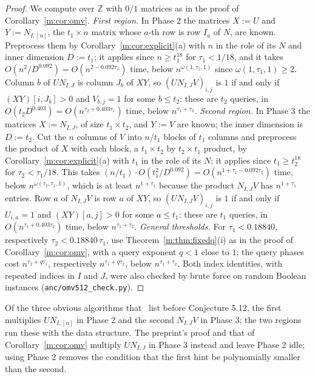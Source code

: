 \documentclass[11pt]{article}
\theoremstyle{definition}
\theoremstyle{remark}
\newcommand{\Z}{\mathbb{Z}}
\newcommand{\HintedOMvRfourteen}{0.18840}%
\begin{document}
\begin{proof}
We compute over $\Z$ with $0/1$ matrices as in the proof of Corollary~\ref{m:cor:omv}. \emph{First region.} In Phase 2 the matrices $X:=U$ and $Y:=N_{I,[n]}$, the $t_1\times n$ matrix whose $a$-th row is row $I_a$ of $N$, are known. Preprocess them by Corollary~\ref{m:cor:explicit}(a) with $n$ in the role of its $N$ and inner dimension $D:=t_1$; it applies since $n\ge t_1^{18}$ for $\tau_1<1/18$, and it takes $O(n^2/D^{0.092})=O(n^{2-0.092\tau_1})$ time, below $n^{\omega(1,\tau_1,1)}$ since $\omega(1,\tau_1,1)\ge2$. Column $b$ of $UN_{I,J}$ is column $J_b$ of $XY$, so $(UN_{I,J}V)_{i,j}$ is $1$ if and only if $(XY)[i,J_b]>0$ and $V_{b,j}=1$ for some $b\le t_2$: these are $t_2$ queries, in $O(t_2D^{0.403})=O(n^{\tau_2+0.403\tau_1})$ time, below $n^{\tau_1+\tau_2}$. \emph{Second region.} In Phase 3 the matrices $X:=N_{I,J}$, of size $t_1\times t_2$, and $Y:=V$ are known; the inner dimension is $D:=t_2$. Cut the $n$ columns of $V$ into $n/t_1$ blocks of $t_1$ columns and preprocess the product of $X$ with each block, a $t_1\times t_2$ by $t_2\times t_1$ product, by Corollary~\ref{m:cor:explicit}(a) with $t_1$ in the role of its $N$; it applies since $t_1\ge t_2^{18}$ for $\tau_2<\tau_1/18$. This takes $(n/t_1)\cdot O(t_1^2/D^{0.092})=O(n^{1+\tau_1-0.092\tau_2})$ time, below $n^{\omega(\tau_2,\tau_1,1)}$, which is at least $n^{1+\tau_1}$ because the product $N_{I,J}V$ has $n^{1+\tau_1}$ entries. Row $a$ of $N_{I,J}V$ is row $a$ of $XY$, so $(UN_{I,J}V)_{i,j}$ is $1$ if and only if $U_{i,a}=1$ and $(XY)[a,j]>0$ for some $a\le t_1$: these are $t_1$ queries, in $O(n^{\tau_1+0.403\tau_2})$ time, below $n^{\tau_1+\tau_2}$. \emph{General thresholds.} For $\tau_1<\HintedOMvRfourteen$, respectively $\tau_2<\HintedOMvRfourteen\,\tau_1$, use Theorem~\ref{m:thm:fixedq}(i) as in the proof of Corollary~\ref{m:cor:omv}, with a query exponent $q<1$ close to $1$; the query phases cost $n^{\tau_2+q\tau_1}$, respectively $n^{\tau_1+q\tau_2}$, below $n^{\tau_1+\tau_2}$. Both index identities, with repeated indices in $I$ and $J$, were also checked by brute force on random Boolean instances (\texttt{anc/omv512\_check.py}).
\end{proof}

Of the three obvious algorithms that~\cite[p.~31]{BNS19} list before Conjecture 5.12, the first multiplies $UN_{I,[n]}$ in Phase 2 and the second $N_{I,J}V$ in Phase 3; the two regions run these with the data structure. The preprint's proof and that of Corollary~\ref{m:cor:omv} multiply $UN_{I,J}$ in Phase 3 instead and leave Phase 2 idle; using Phase 2 removes the condition that the first hint be polynomially smaller than the second.
\end{document}
